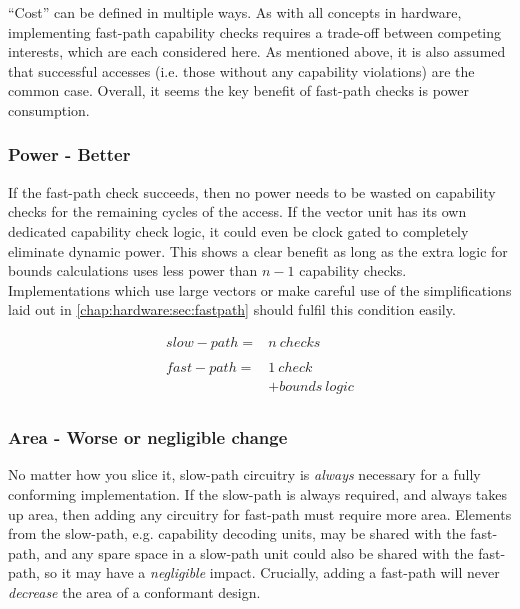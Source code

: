 \enquote{Cost} can be defined in multiple ways.
As with all concepts in hardware, implementing fast-path capability checks requires a trade-off between competing interests, which are each considered here.
As mentioned above, it is also assumed that successful accesses (i.e. those without any capability violations) are the common case.
Overall, it seems the key benefit of fast-path checks is power consumption.

\subsubsection*{Power - Better}
If the fast-path check succeeds, then no power needs to be wasted on capability checks for the remaining cycles of the access.
If the vector unit has its own dedicated capability check logic, it could even be clock gated to completely eliminate dynamic power.
This shows a clear benefit as long as the extra logic for bounds calculations uses less power than $n - 1$ capability checks.
Implementations which use large vectors or make careful use of the simplifications laid out in \cref{chap:hardware:sec:fastpath} should fulfil this condition easily.

\begin{equation}
\begin{array}{lr}
    \mathit{slow-path} =& n\ \mathit{checks} \\
&\\
    \mathit{fast-path} =& 1\ \mathit{check} \\
     &+ \mathit{bounds}\ \mathit{logic} \\

\end{array}
\end{equation}

\subsubsection*{Area - Worse or negligible change}
No matter how you slice it, slow-path circuitry is \emph{always} necessary for a fully conforming implementation.
If the slow-path is always required, and always takes up area, then adding any circuitry for fast-path must require more area.
Elements from the slow-path, e.g. capability decoding units, may be shared with the fast-path, and any spare space in a slow-path unit could also be shared with the fast-path, so it may have a \emph{negligible} impact.
Crucially, adding a fast-path will never \emph{decrease} the area of a conformant design.

